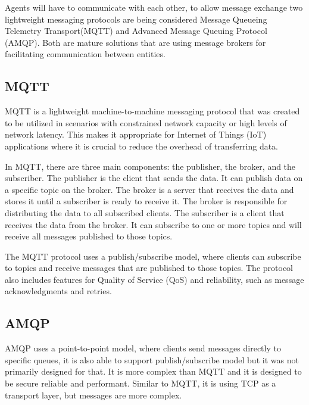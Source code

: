 Agents will have to communicate with each other, to allow message exchange two lightweight messaging protocols are being considered Message Queueing Telemetry Transport(MQTT) and Advanced Message Queuing Protocol (AMQP). Both are mature solutions that are using message brokers for facilitating communication between entities.

\subsection{MQTT}
MQTT is a lightweight machine-to-machine messaging protocol that was created to be utilized in scenarios with constrained network capacity or high levels of network latency. This makes it appropriate for Internet of Things (IoT) applications where it is crucial to reduce the overhead of transferring data.

In MQTT, there are three main components: the publisher, the broker, and the subscriber. The publisher is the client that sends the data. It can publish data on a specific topic on the broker. The broker is a server that receives the data and stores it until a subscriber is ready to receive it. The broker is responsible for distributing the data to all subscribed clients. The subscriber is a client that receives the data from the broker. It can subscribe to one or more topics and will receive all messages published to those topics. \cite{mqtt_specification}

The MQTT protocol uses a publish/subscribe model, where clients can subscribe to topics and receive messages that are published to those topics. The protocol also includes features for Quality of Service (QoS) and reliability, such as message acknowledgments and retries\cite{amqp_vs_mqtt}.

\subsection{AMQP}
AMQP uses a point-to-point model, where clients send messages directly to specific queues, it is also able to support publish/subscribe model but it was not primarily designed for that\cite{amqp_specification}. It is more complex than MQTT and it is designed to be secure reliable and performant. Similar to MQTT, it is using TCP as a transport layer, but messages are more complex.


